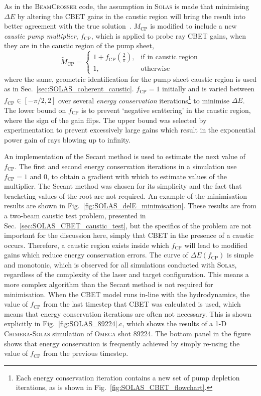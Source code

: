 As in the \textsc{BeamCrosser} code, the assumption in \textsc{Solas} is made that minimising $\Delta E$ by altering the \ac{CBET} gains in the caustic region will bring the result into better agreement with the true solution~\cite{follett_validation_2022}.
$M_{\text{CP}}$ is modified to include a new \textit{caustic pump multiplier}, $f_{\text{CP}}$, which is applied to probe ray \ac{CBET} gains, when they are in the caustic region of the pump sheet,
\begin{equation}
    \label{eq:modified_MCP}
    \tilde{M}_{\text{CP}}= 
\begin{cases}
    1 + f_{\text{CP}} \left( \frac{2}{\pi} \right),& \text{if in caustic region}\\
    1,              & \text{otherwise}
\end{cases}
\end{equation}
where the same, geometric identification for the pump sheet caustic region is used as in Sec.~\ref{sec:SOLAS_coherent_caustic}.
$f_{\text{CP}}=1$ initially and is varied between $f_{\text{CP}}\in [-\pi/2,2]$ over several \textit{energy conservation} iterations\footnote{Each energy conservation iteration contains a new set of pump depletion iterations, as is shown in Fig.~\ref{fig:SOLAS_CBET_flowchart}.} to minimise $\Delta E$.
The lower bound on $f_{\text{CP}}$ is to prevent `negative scattering' in the caustic region, where the sign of the gain flips.
The upper bound was selected by experimentation to prevent excessively large gains which result in the exponential power gain of rays blowing up to infinity.

An implementation of the Secant method is used to estimate the next value of $f_{\text{CP}}$.
The first and second energy conservation iterations in a simulation use $f_{\text{CP}}=1$ and $0$, to obtain a gradient with which to estimate values of the multiplier.
The Secant method was chosen for its simplicity and the fact that bracketing values of the root are not required.
An example of the minimisation results are shown in Fig.~\ref{fig:SOLAS_delE_minimisation}.
These results are from a two-beam caustic test problem, presented in Sec.~\ref{sec:SOLAS_CBET_caustic_test}, but the specifics of the problem are not important for the discussion here, simply that \ac{CBET} in the presence of a caustic occurs.
Therefore, a caustic region exists inside which $f_{\text{CP}}$ will lead to modified gains which reduce energy conservation errors.
The curve of $\Delta E(f_{\text{CP}})$ is simple and monotonic, which is observed for all simulations conducted with \textsc{Solas}, regardless of the complexity of the laser and target configuration.
This means a more complex algorithm than the Secant method is not required for minimisation.
When the \ac{CBET} model runs in-line with the hydrodynamics, the value of $f_{\text{CP}}$ from the last timestep that \ac{CBET} was calculated is used, which means that energy conservation iterations are often not necessary.
This is shown explicitly in Fig.~\ref{fig:SOLAS_89224}.c, which shows the results of a 1-D \textsc{Chimera}-\textsc{Solas} simulation of \textsc{Omega} shot 89224.
The bottom panel in the figure shows that energy conservation is frequently achieved by simply re-using the value of $f_{\text{CP}}$ from the previous timestep.

